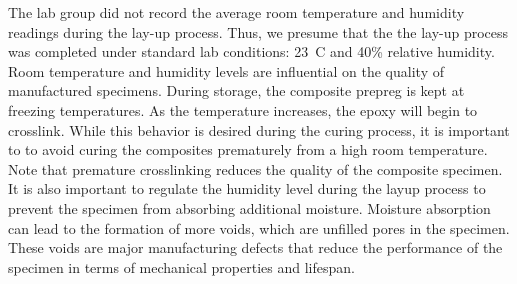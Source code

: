
The lab group did not record the average room temperature and humidity readings during the lay-up process. Thus, we presume that the the lay-up process was completed under standard lab conditions: 23\degree\ C and 40\% relative humidity. Room temperature and humidity levels are influential on the quality of manufactured specimens. During storage, the composite prepreg is kept at freezing temperatures. As the temperature increases, the epoxy will begin to crosslink. While this behavior is desired during the curing process, it is important to to avoid curing the composites prematurely from a high room temperature. Note that premature crosslinking reduces the quality of the composite specimen. It is also important to regulate the humidity level during the layup process to prevent the specimen from absorbing additional moisture. Moisture absorption can lead to the formation of more voids, which are unfilled pores in the specimen. These voids are major manufacturing defects that reduce the performance of the specimen in terms of mechanical properties and lifespan.